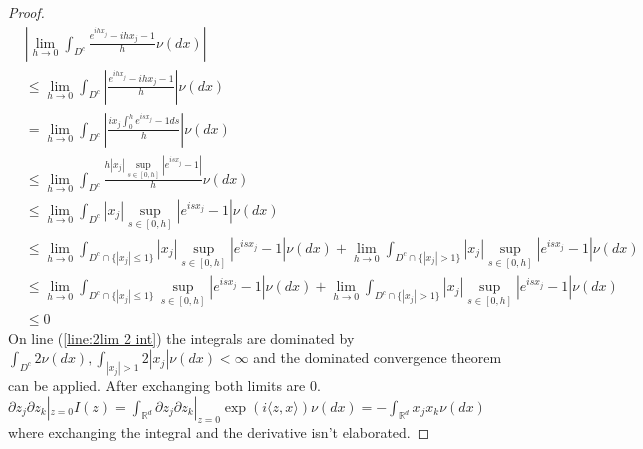 \documentclass[a4paper,11pt]{article}
\begin{document}
\begin{proof}
    {
    \small
    \begin{align}
         & \left| \lim_{h \to 0} \int_{D^{c}}\frac{e^{ihx_{j}}-ihx_{j}-1}{h} \nu(dx)	 \right|                                                                                                                                                                              \\
         & \le \lim_{h \to 0} \int_{D^{c}} \left| \frac{e^{ihx_{j}}-ihx_{j}-1}{h} \right|  \nu(dx)                                                                                                                                                                         \\
         & = \lim_{h \to 0} \int_{D^{c}} \left| \frac{ix_{j}\int_{0}^{h}e^{isx_{j}}-1ds }{h} \right|  \nu(dx)                                                                                                                                                              \\
         & \le  \lim_{h \to 0} \int_{D^{c}} \frac{h |x_{j}| \sup_{s \in [0,h]}\left|e^{isx_{j}}-1\right| }{h}   \nu(dx)                                                                                                                                                    \\
         & \le  \lim_{h \to 0} \int_{D^{c}}  |x_{j}| \sup_{s \in [0,h]}\left|e^{isx_{j}}-1\right|   \nu(dx)                                                                                                                                                                \\
         & \le  \lim_{h \to 0} \int_{D^{c} \cap \{|x_{j}|\le 1 \}}  |x_{j}| \sup_{s \in [0,h]}\left|e^{isx_{j}}-1\right|   \nu(dx) + \lim_{h \to 0}\int_{D^{c} \cap \{|x_{j}|>1 \}}  |x_{j}| \sup_{s \in [0,h]}\left|e^{isx_{j}}-1\right|   \nu(dx)                        \\
         & \le  \lim_{h \to 0}\int_{D^{c} \cap \{|x_{j}|\le 1 \}}  \sup_{s \in [0,h]}\left|e^{isx_{j}}-1\right|   \nu(dx) + \lim_{h \to 0}\int_{D^{c} \cap \{|x_{j}|>1 \}}  |x_{j}| \sup_{s \in [0,h]}\left|e^{isx_{j}}-1\right|   \nu(dx)         \label{line:2lim 2 int} \\
         & \le 0
    \end{align}
    }
    On line (\ref{line:2lim 2 int}) the integrals are dominated by $\int_{D^{c}} 2 \nu(dx), \int_{|x_{j}|>1 }2 |x_{j}| \nu(dx)  < \infty $ and the dominated convergence theorem can be applied. After exchanging both limits are $0$. \\
    $\partial z_{j} \partial z_{k}|_{z=0}I(z) = \int_{\mathbb{R}^{d}}  \partial z_{j} \partial z_{k} |_{z=0}\operatorname{e x p} ( i \langle z, x \rangle) \nu( d x )
        = -\int_{\mathbb{R}^{d}} x_{j} x_{k} \nu( d x )$ where exchanging the integral and the derivative isn't  elaborated.
\end{proof}

\printbibliography
\end{document}
